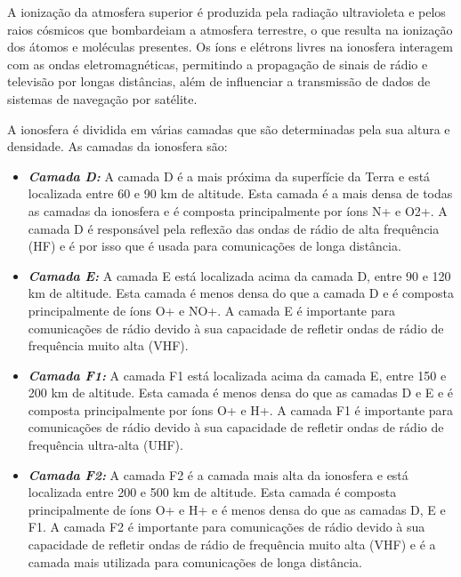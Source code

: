 \documentclass[a4paper, 12pt, onecolumn,singlespacing]{article}
\begin{document}
\begin{itemize}
		A ionização da atmosfera superior é produzida pela radiação ultravioleta e pelos raios cósmicos que bombardeiam a atmosfera terrestre, o que resulta na ionização dos átomos e moléculas presentes. Os íons e elétrons livres na ionosfera interagem com as ondas eletromagnéticas, permitindo a propagação de sinais de rádio e televisão por longas distâncias, além de influenciar a transmissão de dados de sistemas de navegação por satélite.
		
		A ionosfera é dividida em várias camadas que são determinadas pela sua altura e densidade. As camadas da ionosfera são:
		\begin{itemize}
			\item \textbf{\textit{Camada D:}} A camada D é a mais próxima da superfície da Terra e está localizada entre 60 e 90 km de altitude. Esta camada é a mais densa de todas as camadas da ionosfera e é composta principalmente por íons N+ e O2+. A camada D é responsável pela reflexão das ondas de rádio de alta frequência (HF) e é por isso que é usada para comunicações de longa distância.
			
			\item \textbf{\textit{Camada E:}} A camada E está localizada acima da camada D, entre 90 e 120 km de altitude. Esta camada é menos densa do que a camada D e é composta principalmente de íons O+ e NO+. A camada E é importante para comunicações de rádio devido à sua capacidade de refletir ondas de rádio de frequência muito alta (VHF).
			
			\item \textbf{\textit{Camada F1:}} A camada F1 está localizada acima da camada E, entre 150 e 200 km de altitude. Esta camada é menos densa do que as camadas D e E e é composta principalmente por íons O+ e H+. A camada F1 é importante para comunicações de rádio devido à sua capacidade de refletir ondas de rádio de frequência ultra-alta (UHF).
			
			\item \textbf{\textit{Camada F2:}} A camada F2 é a camada mais alta da ionosfera e está localizada entre 200 e 500 km de altitude. Esta camada é composta principalmente de íons O+ e H+ e é menos densa do que as camadas D, E e F1. A camada F2 é importante para comunicações de rádio devido à sua capacidade de refletir ondas de rádio de frequência muito alta (VHF) e é a camada mais utilizada para comunicações de longa distância.
		\end{itemize}
	

\end{itemize}
\end{document}
